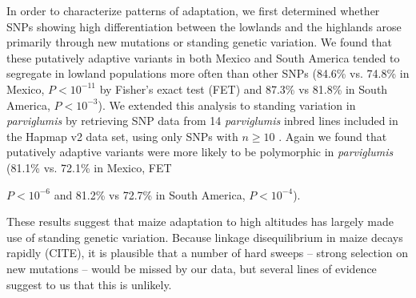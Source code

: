 In order to characterize patterns of adaptation, we first determined whether  SNPs showing high differentiation between the lowlands and the highlands arose primarily through new mutations or standing genetic variation.  
We found that these putatively adaptive variants in both Mexico and South America tended to segregate in lowland populations more often than other SNPs (84.6\% vs. 74.8\% in Mexico, $P < 10^{-11}$ by Fisher's exact test (FET) and 87.3\% vs 81.8\% in South America,  $P< 10^{-3}$).  
We extended this analysis to standing variation in \textit{parviglumis} by retrieving SNP data from 14 \textit{parviglumis} inbred lines included in the Hapmap v2 data set, using only SNPs with $n\geq10$ \citep{Hufford_2012_22660546}.  Again we found that putatively adaptive variants were more likely to be polymorphic in \textit{parviglumis} (81.1\% vs. 72.1\% in Mexico, FET {$P < 10^{-6}$ and 81.2\% vs 72.7\% in South America,  $P< 10^{-4}$).  

These results suggest that maize adaptation to high altitudes has largely made use of standing genetic variation. 
Because linkage disequilibrium in maize decays rapidly (CITE), it is plausible that a number of hard sweeps -- strong selection on new mutations -- would be missed by our data, but several lines of evidence suggest to us that this is unlikely.  

}
